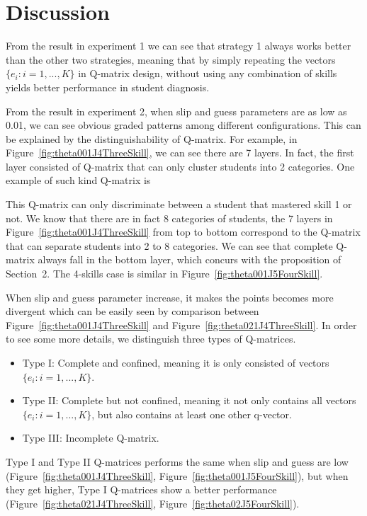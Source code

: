 \documentclass{edm_template}
\newcommand{\Michel}[1]{{\textcolor{red}{[#1]}}}
\begin{document}
%  

\section{Discussion}
From the result in experiment 1 we can see that strategy 1 always works better than the other two strategies, meaning that by simply repeating the vectors $\{e_{i}:i=1,...,K\}$ in Q-matrix design, without using any combination of skills yields better performance in student diagnosis. %

From the result in experiment 2, when slip and guess parameters are as low as 0.01, we can see obvious graded patterns among different configurations. This can be explained by the distinguishability of Q-matrix. For example, in Figure~\ref{fig:theta001J4ThreeSkill}, we can see there are 7 layers. In fact, the first layer consisted of Q-matrix that can only cluster students into 2 categories. One example of such kind Q-matrix is

This Q-matrix can only discriminate between a student that mastered skill 1 or not. We know that there are in fact 8 categories of students, the 7 layers in Figure~\ref{fig:theta001J4ThreeSkill} from top to bottom correspond to the Q-matrix that can separate students into 2 to 8 categories. We can see that complete Q-matrix always fall in the bottom layer, which concurs with the proposition of Section~2. The 4-skills case is similar in Figure~\ref{fig:theta001J5FourSkill}.

When slip and guess parameter increase, it makes the points becomes more divergent which can be easily seen by comparison between Figure~\ref{fig:theta001J4ThreeSkill} and Figure~\ref{fig:theta021J4ThreeSkill}. In order to see some more details, we distinguish three types of Q-matrices. 
\begin{itemize}
\item Type I: Complete and confined, meaning it is only consisted of vectors $\{e_{i}:i=1,...,K\}$.
\item Type II: Complete but not confined, meaning it not only contains all vectors $\{e_{i}:i=1,...,K\}$, but also contains at least one other q-vector.
\item Type III: Incomplete Q-matrix.
\end{itemize}
Type I and Type II Q-matrices performs the same when slip and guess are low (Figure~\ref{fig:theta001J4ThreeSkill}, Figure~\ref{fig:theta001J5FourSkill}), but when they get higher, Type I Q-matrices show a better performance (Figure~\ref{fig:theta021J4ThreeSkill}, Figure~\ref{fig:theta02J5FourSkill}).
\end{document}

